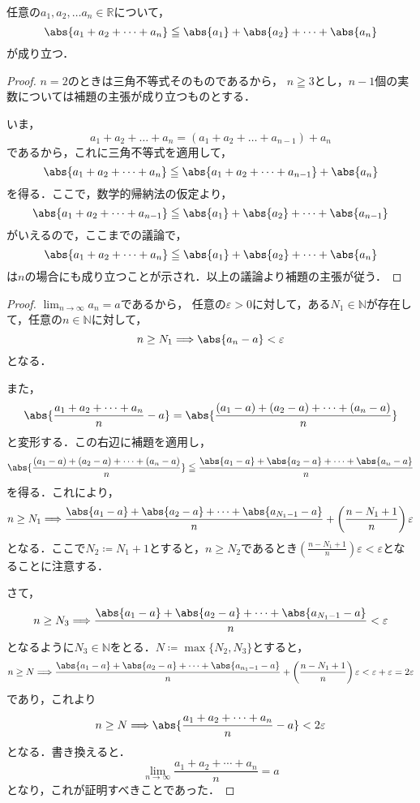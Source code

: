\documentclass[a4paper,10pt,fleqn]{ltjsarticle}
\begin{document}
    任意の$a_1 , a_2 , \dots a_n \in \mathbb{R}$について，
    \[
        \abs{a_1+a_2+\dots+a_n} \leqq \abs{a_1}+\abs{a_2}+\dots+\abs{a_n}
    \]
    が成り立つ．


\begin{proof}
    $n=2$のときは三角不等式そのものであるから，
    $n \geqq 3$とし，$n-1$個の実数については補題の主張が成り立つものとする．

    いま，
    \[
        a_1 + a_2 + \dots + a_n = (a_1+a_2+\dots+a_{n-1})+a_n
    \]
    であるから，これに三角不等式を適用して，
    \[
        \abs{a_1+a_2+\dots+a_n} \leqq \abs{a_1+a_2+\dots+a_{n-1}} +\abs{a_n}
    \]
    を得る．ここで，数学的帰納法の仮定より，
    \[
        \abs{a_1+a_2+\dots+a_{n-1}} \leqq \abs{a_1}+\abs{a_2}+\dots+\abs{a_{n-1}}
    \]
    がいえるので，ここまでの議論で，
    \[
        \abs{a_1+a_2+\dots+a_n} \leqq \abs{a_1}+\abs{a_2}+\dots+\abs{a_n}
    \]
    は$n$の場合にも成り立つことが示され．以上の議論より補題の主張が従う．
\end{proof}

\begin{tleftbar}
    \begin{proof}
    $\lim_{n \to \infty} a_n =a$であるから，
    任意の$\varepsilon >0$に対して，ある$N_1 \in \mathbb{N}$が存在して，任意の$n \in \mathbb{N}$に対して，
    \[
        n \ge N_1 \Longrightarrow \abs{a_n -a}<\varepsilon 
    \]
    となる．

    また，
    \[
        \abs{\frac{a_1+a_2+\cdots+a_n}{n}-a}= \abs{\frac{(a_1-a)+(a_2-a)+\cdots+(a_n-a)}{n}}
    \]
    と変形する．この右辺に補題を適用し，
    \[
        \abs{\frac{(a_1-a)+(a_2-a)+\cdots+(a_n-a)}{n}} \leqq \frac{\abs{a_1-a}+\abs{a_2-a}+\cdots+\abs{a_n-a}}{n}
    \]
    を得る．これにより，
    \[
        n \ge N_1 \Longrightarrow \frac{\abs{a_1-a}+\abs{a_2-a}+\cdots+\abs{a_{N_1-1}-a}}{n} +\left( \frac{n-N_1+1}{n} \right ) \varepsilon 
    \]
    となる．ここで$N_2 \coloneqq N_1 +1$とすると，$n \ge N_2$であるとき$\left( \frac{n-N_1+1}{n} \right ) \varepsilon < \varepsilon$となることに注意する．
    
    さて，
    \[
        n \ge N_3 \Longrightarrow \frac{\abs{a_1-a}+\abs{a_2-a}+\cdots+\abs{a_{N_1-1}-a}}{n}<\varepsilon
    \]
    となるように$N_3 \in \mathbb{N}$をとる．$N \coloneqq \max \{ N_2 , N_3 \}$とすると，
    \[
        n \ge N \Longrightarrow \frac{\abs{a_1-a}+\abs{a_2-a}+\cdots+\abs{a_{n_1-1}-a}}{n} +\left( \frac{n-N_1+1}{n} \right ) \varepsilon < \varepsilon + \varepsilon = 2 \varepsilon
    \]
    であり，これより
    \[
        n \ge N \Longrightarrow \abs{\frac{a_1+a_2+\cdots+a_n}{n}-a} < 2 \varepsilon
    \]
    となる．書き換えると．
    \[
        \lim_{n \to \infty} \frac{a_1+a_2+\cdots+a_n}{n}=a
    \]
    となり，これが証明すべきことであった．
    \end{proof}
\end{tleftbar}
\end{document}
